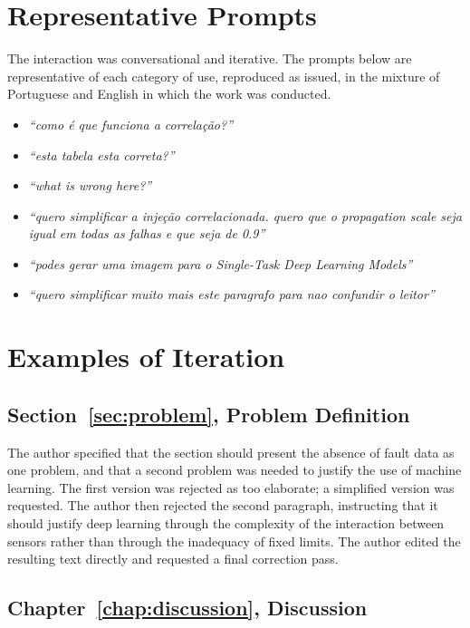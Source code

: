 \section{Representative Prompts}

The interaction was conversational and iterative. The prompts below are representative of each category of
use, reproduced as issued, in the mixture of Portuguese and English in which the work was conducted.

\begin{itemize}
    \item \emph{``como é que funciona a correlação?''}
    \item \emph{``esta tabela esta correta?''}
    \item \emph{``what is wrong here?''}
    \item \emph{``quero simplificar a injeção correlacionada. quero que o propagation scale seja igual em
          todas as falhas e que seja de 0.9''}
    \item \emph{``podes gerar uma imagem para o Single-Task Deep Learning Models''}
    \item \emph{``quero simplificar muito mais este paragrafo para nao confundir o leitor''}
\end{itemize}

\section{Examples of Iteration}

\subsection*{Section~\ref{sec:problem}, Problem Definition}

The author specified that the section should present the absence of fault data as one problem, and that a
second problem was needed to justify the use of machine learning. The first version was rejected as too
elaborate; a simplified version was requested. The author then rejected the second paragraph, instructing
that it should justify deep learning through the complexity of the interaction between sensors rather than
through the inadequacy of fixed limits. The author edited the resulting text directly and requested a final
correction pass.

\subsection*{Chapter~\ref{chap:discussion}, Discussion}

